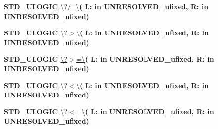 \begin{DoxyCompactItemize}
\item 
{\bfseries {\bfseries \textcolor{comment}{S\+T\+D\+\_\+\+U\+L\+O\+G\+I\+C}\textcolor{vhdlchar}{ }}} \hyperlink{class__fixed__pkg_a49424a53dc1761ab25455e586bd2412c}{\textbackslash{}?/=\textbackslash{}}{\bfseries  ( }{\bfseries \textcolor{vhdlchar}{L\+: }\textcolor{stringliteral}{in }\textcolor{vhdlchar}{U\+N\+R\+E\+S\+O\+L\+V\+E\+D\+\_\+ufixed}}{\bfseries  , \textcolor{vhdlchar}{R\+: }\textcolor{stringliteral}{in }\textcolor{vhdlchar}{U\+N\+R\+E\+S\+O\+L\+V\+E\+D\+\_\+ufixed}}{\bfseries  )} 
\item 
{\bfseries {\bfseries \textcolor{comment}{S\+T\+D\+\_\+\+U\+L\+O\+G\+I\+C}\textcolor{vhdlchar}{ }}} \hyperlink{class__fixed__pkg_a28cc0c1d8980098982ca0485b5f2fe71}{\textbackslash{}?$>$\textbackslash{}}{\bfseries  ( }{\bfseries \textcolor{vhdlchar}{L\+: }\textcolor{stringliteral}{in }\textcolor{vhdlchar}{U\+N\+R\+E\+S\+O\+L\+V\+E\+D\+\_\+ufixed}}{\bfseries  , \textcolor{vhdlchar}{R\+: }\textcolor{stringliteral}{in }\textcolor{vhdlchar}{U\+N\+R\+E\+S\+O\+L\+V\+E\+D\+\_\+ufixed}}{\bfseries  )} 
\item 
{\bfseries {\bfseries \textcolor{comment}{S\+T\+D\+\_\+\+U\+L\+O\+G\+I\+C}\textcolor{vhdlchar}{ }}} \hyperlink{class__fixed__pkg_a5e612bbbb0da47cd9a87053bf3bc3697}{\textbackslash{}?$>$=\textbackslash{}}{\bfseries  ( }{\bfseries \textcolor{vhdlchar}{L\+: }\textcolor{stringliteral}{in }\textcolor{vhdlchar}{U\+N\+R\+E\+S\+O\+L\+V\+E\+D\+\_\+ufixed}}{\bfseries  , \textcolor{vhdlchar}{R\+: }\textcolor{stringliteral}{in }\textcolor{vhdlchar}{U\+N\+R\+E\+S\+O\+L\+V\+E\+D\+\_\+ufixed}}{\bfseries  )} 
\item 
{\bfseries {\bfseries \textcolor{comment}{S\+T\+D\+\_\+\+U\+L\+O\+G\+I\+C}\textcolor{vhdlchar}{ }}} \hyperlink{class__fixed__pkg_abe3172f3a06b21b546baa6a7fc1f29c7}{\textbackslash{}?$<$\textbackslash{}}{\bfseries  ( }{\bfseries \textcolor{vhdlchar}{L\+: }\textcolor{stringliteral}{in }\textcolor{vhdlchar}{U\+N\+R\+E\+S\+O\+L\+V\+E\+D\+\_\+ufixed}}{\bfseries  , \textcolor{vhdlchar}{R\+: }\textcolor{stringliteral}{in }\textcolor{vhdlchar}{U\+N\+R\+E\+S\+O\+L\+V\+E\+D\+\_\+ufixed}}{\bfseries  )} 
\item 
{\bfseries {\bfseries \textcolor{comment}{S\+T\+D\+\_\+\+U\+L\+O\+G\+I\+C}\textcolor{vhdlchar}{ }}} \hyperlink{class__fixed__pkg_a276b77e776712ce9027d7858f46bf7b7}{\textbackslash{}?$<$=\textbackslash{}}{\bfseries  ( }{\bfseries \textcolor{vhdlchar}{L\+: }\textcolor{stringliteral}{in }\textcolor{vhdlchar}{U\+N\+R\+E\+S\+O\+L\+V\+E\+D\+\_\+ufixed}}{\bfseries  , \textcolor{vhdlchar}{R\+: }\textcolor{stringliteral}{in }\textcolor{vhdlchar}{U\+N\+R\+E\+S\+O\+L\+V\+E\+D\+\_\+ufixed}}{\bfseries  )} 

\end{DoxyCompactItemize}

